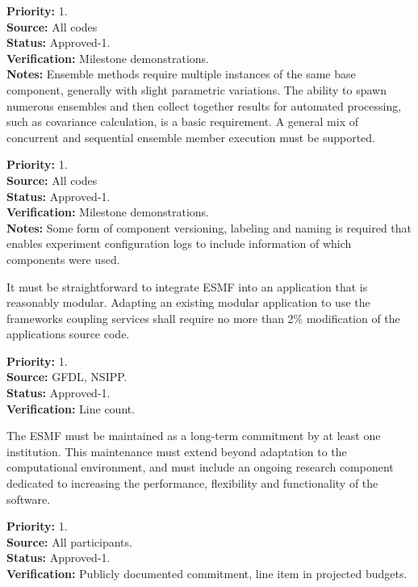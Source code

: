 \begin{reqlist}
{\bf Priority:} 1. \\
{\bf Source:} All codes\\
{\bf Status:} Approved-1. \\
{\bf Verification:} Milestone demonstrations.\\
{\bf Notes:} Ensemble methods require multiple instances of
the same base component, generally with slight parametric variations.
The ability to spawn numerous ensembles and then collect together
results for automated processing, such as covariance calculation, 
is a basic requirement. A general mix of concurrent and sequential ensemble 
member execution must be supported.
\end{reqlist}

\begin{reqlist}
{\bf Priority:} 1. \\
{\bf Source:} All codes\\
{\bf Status:} Approved-1. \\
{\bf Verification:} Milestone demonstrations.\\
{\bf Notes:} Some form of component versioning, labeling and naming
is required that enables experiment configuration logs
to include information of which components were used.
\end{reqlist}

It must be straightforward to integrate ESMF into an application 
that is reasonably modular. Adapting an existing modular application
to use the frameworks coupling services shall require no more
than 2\% modification of the applications source code.
\begin{reqlist}
{\bf Priority:} 1. \\
{\bf Source:} GFDL, NSIPP. \\
{\bf Status:} Approved-1. \\
{\bf Verification:} Line count.
\end{reqlist}

The ESMF must be maintained as a long-term commitment by at least one
institution.  This maintenance must extend beyond adaptation to the 
computational environment, and must include an ongoing research component
dedicated to increasing the performance, flexibility and functionality of
the software.
\begin{reqlist}
{\bf Priority:} 1. \\
{\bf Source:} All participants. \\
{\bf Status:} Approved-1. \\
{\bf Verification:} Publicly documented commitment, line item in 
projected budgets.
\end{reqlist}


